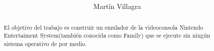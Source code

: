 \documentclass[a4paper,12pt,spanish,notitlepage]{report}
\begin{document}
\title{
}
\author{Martín Villagra}
\maketitle
\vspace{1cm}
\vspace{\fill}
\begin{abstract}\centering
El objetivo del trabajo es construir un emulador de la videoconsola Nintendo Entertaiment System(también conocida como Family) que se ejecute sin ningún sistema operativo de por medio.
\end{abstract}
\raggedright
\tableofcontents


\end{document}
